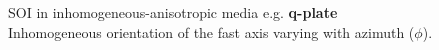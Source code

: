 \documentclass[12pt, dvipsnames]{beamer}
\numberwithin{equation}{section}
\begin{document}
\begin{frame}[t]{SOI in inhomogeneous-anisotropic media} 
	e.g. \textbf{q-plate}\\\pause
	Inhomogeneous orientation of the fast axis varying with azimuth ($\phi$).\\
	
	\begin{columns}
		\begin{center}
		\end{center}
	\end{columns}
\end{frame}
\end{document}

